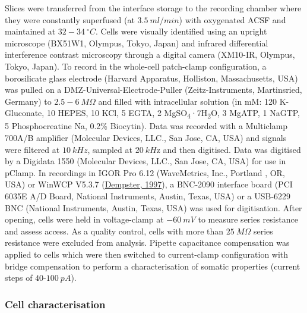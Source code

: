 \documentclass[
  12pt,
  a4paper,
  openany]{book}
\begin{document}
Slices were transferred from the interface storage to the recording chamber where they were constantly superfused (at \(3.5\ ml/min\)) with oxygenated ACSF and maintained at \(32-34\ ^{\circ}C\). Cells were visually identified using an upright microscope (BX51W1, Olympus, Tokyo, Japan) and infrared differential interference contrast microscopy through a digital camera (XM10-IR, Olympus, Tokyo, Japan). To record in the whole-cell patch-clamp configuration, a borosilicate glass electrode (Harvard Apparatus, Holliston, Massachusetts, USA) was pulled on a DMZ-Universal-Electrode-Puller (Zeitz-Instruments, Martinsried, Germany) to \(2.5-6\ M \Omega\) and filled with intracellular solution (in mM: 120 K-Gluconate, 10 HEPES, 10 KCl, 5 EGTA, 2 MgSO\textsubscript{4}·7H\textsubscript{2}O, 3 MgATP, 1 NaGTP, 5 Phosphocreatine Na, 0.2\% Biocytin). Data was recorded with a Multiclamp 700A/B amplifier (Molecular Devices, LLC., San Jose, CA, USA) and signals were filtered at \(10\ kHz\), sampled at \(20\ kH\)z and then digitised. Data was digitised by a Digidata 1550 (Molecular Devices, LLC., San Jose, CA, USA) for use in pClamp. In recordings in IGOR Pro 6.12 (WaveMetrics, Inc., Portland , OR, USA) or WinWCP V5.3.7 (\protect\hyperlink{ref-dempster_new_1997}{Dempster, 1997}), a BNC-2090 interface board (PCI 6035E A/D Board, National Instruments, Austin, Texas, USA) or a USB-6229 BNC (National Instruments, Austin, Texas, USA) was used for digitisation. After opening, cells were held in voltage-clamp at \(-60\ mV\) to measure series resistance and assess access. As a quality control, cells with more than \(25\ M\Omega\) series resistance were excluded from analysis. Pipette capacitance compensation was applied to cells which were then switched to current-clamp configuration with bridge compensation to perform a characterisation of somatic properties (current steps of \(40\)-\(100\ pA\)).

\hypertarget{cell-characterisation}{%
\subsubsection{Cell characterisation}\label{cell-characterisation}}
\end{document}
